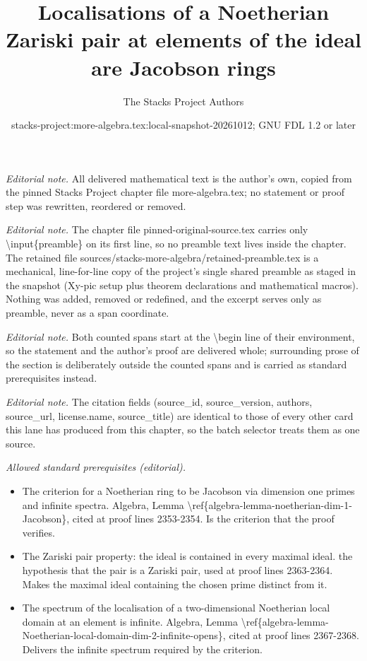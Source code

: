 \documentclass[10pt,a4paper]{amsart}
\title{Localisations of a Noetherian Zariski pair at elements of the ideal are Jacobson rings}
\author{The Stacks Project Authors}
\date{stacks-project:more-algebra.tex:local-snapshot-20261012; GNU FDL 1.2 or later}
\theoremstyle{plain}
\theoremstyle{definition}
\theoremstyle{remark}
\numberwithin{equation}{subsection}
\begin{document}
\maketitle
\setcounter{subsection}{1}
\noindent\textit{Editorial note.} All delivered mathematical text is the author's own, copied from the pinned Stacks Project chapter file more-algebra.tex; no statement or proof step was rewritten, reordered or removed.\par\medskip
\noindent\textit{Editorial note.} The chapter file pinned-original-source.tex carries only \textbackslash{}input\{preamble\} on its first line, so no preamble text lives inside the chapter. The retained file sources/stacks-more-algebra/retained-preamble.tex is a mechanical, line-for-line copy of the project's single shared preamble as staged in the snapshot (Xy-pic setup plus theorem declarations and mathematical macros). Nothing was added, removed or redefined, and the excerpt serves only as preamble, never as a span coordinate.\par\medskip
\noindent\textit{Editorial note.} Both counted spans start at the \textbackslash{}begin line of their environment, so the statement and the author's proof are delivered whole; surrounding prose of the section is deliberately outside the counted spans and is carried as standard prerequisites instead.\par\medskip
\noindent\textit{Editorial note.} The citation fields (source\_id, source\_version, authors, source\_url, license.name, source\_title) are identical to those of every other card this lane has produced from this chapter, so the batch selector treats them as one source.\par\medskip
\noindent\textit{Allowed standard prerequisites (editorial).}\begin{itemize}
\item The criterion for a Noetherian ring to be Jacobson via dimension one primes and infinite spectra. Algebra, Lemma \textbackslash{}ref\{algebra-lemma-noetherian-dim-1-Jacobson\}, cited at proof lines 2353-2354. Is the criterion that the proof verifies.
\item The Zariski pair property: the ideal is contained in every maximal ideal. the hypothesis that the pair is a Zariski pair, used at proof lines 2363-2364. Makes the maximal ideal containing the chosen prime distinct from it.
\item The spectrum of the localisation of a two-dimensional Noetherian local domain at an element is infinite. Algebra, Lemma \textbackslash{}ref\{algebra-lemma-Noetherian-local-domain-dim-2-infinite-opens\}, cited at proof lines 2367-2368. Delivers the infinite spectrum required by the criterion.
\end{itemize}\medskip
\end{document}
